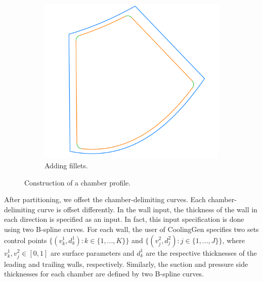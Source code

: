 \documentclass[a4paper, 11pt]{report}
\theoremstyle{definition}
\begin{document}
\begin{figure}[H]
\begin{subfigure}{.32\textwidth}
		\end{subfigure}
		\begin{subfigure}{.32\textwidth}
			\includegraphics[width=\textwidth]{../tec/chambers/83.png}
			\caption{Adding fillets.}
		\end{subfigure}
		\caption{Construction of a chamber profile.}
		\label{fig:chamber_shrinking}
	\end{figure}

	After partitioning, we offset the chamber-delimiting curves. Each chamber-delimiting curve is offset differently. In the wall input, the thickness of the wall in each direction is specified as an input. In fact, this input specification is done using two B-spline curves. For each wall, the user of CoolingGen specifies two sets control points $\{(v^1_k, d^1_k) : k \in \{1, ..., K\}\}$ and $\{(v^2_j, d^2_j) : j \in \{1, ..., J\}\}$, where $v^1_k, v^2_j \in [0,1]$ are surface parameters and $d^1_k$ are the respective thicknesses of the leading and trailing walls, respectively. Similarly, the suction and pressure side thicknesses for each chamber are defined by two B-spline curves.
\end{document}
